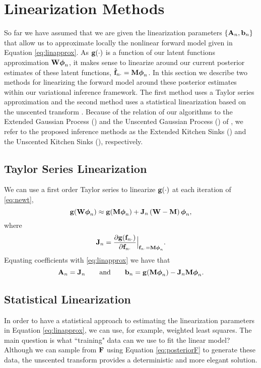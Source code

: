 \section{Linearization Methods}
So far we have assumed that we are given the linearization parameters $\{\mathbf{A}_n, \mathbf{b}_n\}$ that allow us to 
approximate locally the nonlinear forward model given in Equation   \eqref{eq:linapprox}. As 
$\mathbf{g}\!\left({{\cdot}}\right)$  is a function of our latent functions approximation ${\mathbf{W} \boldsymbol\phi_n}$,  
it makes sense to linearize around our current posterior estimates of these latent functions, 
$\hat{\mathbf{f}}_{n \cdot} =\mathbf{M} \boldsymbol\phi_n$. In this section we describe two methods for linearizing 
the  forward model around these posterior estimates within our variational 
inference framework. The first method uses a Taylor series approximation and the second 
method uses a statistical linearization \citep{Geist2010} based on the unscented transform \citep{Julier2004}. 
Because of the relation of our algorithms to the Extended Gaussian Process (\egp) and 
the  Unscented Gaussian Process (\ugp) of \citet{steinberg-bonilla-nips-2014},   we refer to 
the proposed inference methods as  the Extended Kitchen Sinks (\eks) and the 
Unscented Kitchen Sinks (\uks), respectively.
%
\subsection{Taylor Series Linearization}
We can use a first order Taylor series to linearize $\mathbf{g}\!\left({{\cdot}}\right)$ at each
iteration of \eqref{eq:newt},
\begin{equation}
    \mathbf{g}\!\left({{\mathbf{W}\boldsymbol\phi_n}}\right) \approx \mathbf{g}\!\left({{\mathbf{M}\boldsymbol\phi_n}}\right) +
    \mathbf{J}_{n}\left({\mathbf{W} - \mathbf{M}}\right)\boldsymbol\phi_n,
\end{equation}
where 
\begin{equation}
\mathbf{J}_{n} = \frac{ \partial\mathbf{g}\!\left({{\mathbf{f}_{n \cdot}}}\right) } {  \partial \mathbf{f}_{n \cdot} }  \Big|_{\mathbf{f}_{n \cdot} = \mathbf{M} \boldsymbol\phi_n } \text{.}
\end{equation}
Equating coefficients with \eqref{eq:linapprox} we have that
\begin{equation}
    \mathbf{A}_n = \mathbf{J}_{n} \qquad \text{and} \qquad \mathbf{b}_n = 
        \mathbf{g}\!\left({{\mathbf{M}\boldsymbol\phi_n}}\right) - \mathbf{J}_{n}\mathbf{M}\boldsymbol\phi_n.
\end{equation}
%
\subsection{Statistical Linearization}
In order to have a  statistical approach to estimating the linearization parameters 
 in  Equation \eqref{eq:linapprox}, we can  use, for example, weighted least squares.  The main question 
is what ``training" data  can we use to fit the linear model? Although we can 
sample from $\mathbf{F}$ using Equation \eqref{eq:posteriorF} to generate these data, 
the unscented transform  \citep[\ut;][]{Julier2004} provides a deterministic and more elegant solution. 

